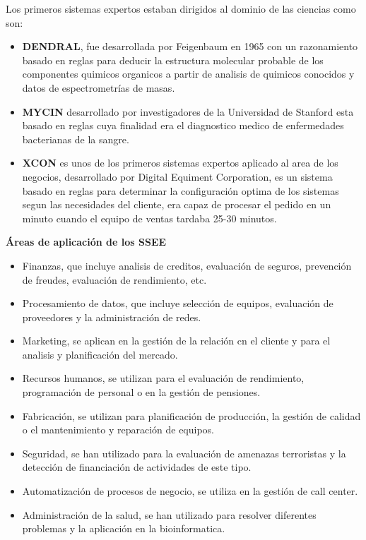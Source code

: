\documentclass[12pt, twoside, openright]{report} %
\begin{document}
Los primeros sistemas expertos estaban dirigidos al dominio de las ciencias como son:
\begin{itemize}
	\item \textbf{DENDRAL}, fue desarrollada por Feigenbaum en 1965 con un razonamiento basado en reglas para deducir la estructura molecular probable de los componentes quimicos organicos a partir de analisis de quimicos conocidos y datos de espectrometrías de masas.
	\item \textbf{MYCIN} desarrollado por investigadores de la Universidad de Stanford esta basado en reglas cuya finalidad era el diagnostico medico de enfermedades bacterianas de la sangre.
	\item \textbf{XCON} es unos de los primeros sistemas expertos aplicado al area de los negocios, desarrollado por Digital Equiment Corporation, es un sistema basado en reglas para determinar la configuración optima de los sistemas segun las necesidades del cliente, era capaz de procesar el pedido en un minuto cuando el equipo de ventas tardaba 25-30 minutos.
\end{itemize}

\textbf{Áreas de aplicación de los SSEE}
\begin{itemize}
	\item Finanzas, que incluye analisis de creditos, evaluación de seguros, prevención de freudes, evaluación de rendimiento, etc.
	\item Procesamiento de datos, que incluye selección de equipos, evaluación de proveedores y la administración de redes.
	\item Marketing, se aplican en la gestión de la relación cn el cliente y para el analisis y planificación del mercado.
	\item Recursos humanos, se utilizan para el evaluación de rendimiento, programación de personal o en la gestión de pensiones.
	\item Fabricación, se utilizan para planificación de producción, la gestión de calidad o el mantenimiento y reparación de equipos.
	\item Seguridad, se han utilizado para la evaluación de amenazas terroristas y la detección de financiación de actividades de este tipo.
	\item Automatización de procesos de negocio, se utiliza en la gestión de call center.
	\item Administración de la salud, se han utilizado para resolver diferentes problemas y la aplicación en la bioinformatica.
\end{itemize}
\end{document}
